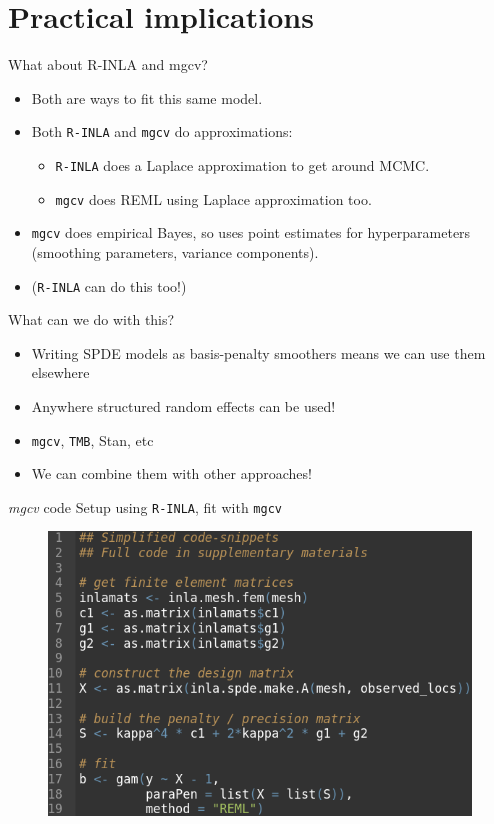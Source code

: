 \documentclass{beamer}
\begin{document}
\section{Practical implications}
\begin{frame}{What about R-INLA and mgcv?}
  \begin{itemize}
   \item Both are ways to fit this same model.   
    \item Both \texttt{R-INLA} and \texttt{mgcv} do approximations:
    \begin{itemize}
    		\item \texttt{R-INLA} does a Laplace approximation to get around MCMC.
 	    \item \texttt{mgcv} does REML using Laplace approximation too.
	\end{itemize}
    	\item \texttt{mgcv} does empirical Bayes, so uses point estimates for hyperparameters (smoothing parameters, variance components). 
    \item (\texttt{R-INLA} can do this too!)
  \end{itemize}
\end{frame}

\begin{frame}{What can we do with this?}
  \begin{itemize}
	\item Writing SPDE models as basis-penalty smoothers means we can use them elsewhere
 	\item Anywhere structured random effects can be used!
	\item \texttt{mgcv}, \texttt{TMB}, Stan, etc
	\item We can combine them with other approaches!
  \end{itemize}
\end{frame}

\begin{frame}{\textit{mgcv} code}
Setup using \texttt{R-INLA}, fit with \texttt{mgcv}
		\begin{figure}
		\begin{center}
			\includegraphics[scale = 0.5]{figures/mgcvcode.png}
		\end{center}
	\end{figure}
\end{frame}
\end{document}
